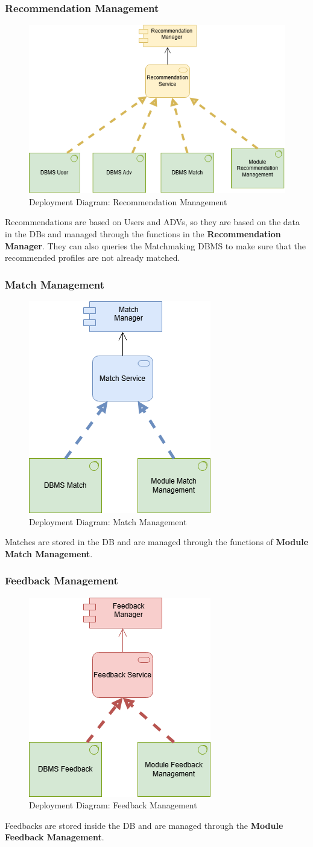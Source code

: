 \subsubsection{Recommendation Management}
\begin{figure}[H]
    \centering
    \includegraphics[width=0.45\linewidth]{images/architectural design/deployment/depl-recc.drawio.png}
    \caption{Deployment Diagram: Recommendation Management}
\end{figure}
Recommendations are based on Users and ADVs, so they are based on the data in the DBs and managed through the functions in the \textbf{Recommendation Manager}. They can also queries the Matchmaking DBMS to make sure that the recommended profiles are not already matched. 

\subsubsection{Match Management}
\begin{figure}[H]
    \centering
    \includegraphics[width=0.25\linewidth]{images/architectural design/deployment/depl-match.drawio.png}
    \caption{Deployment Diagram: Match Management}
\end{figure}
Matches are stored in the DB and are managed through the functions of \textbf{Module Match Management}.

\subsubsection{Feedback Management}
\begin{figure}[H]
    \centering
    \includegraphics[width=0.25\linewidth]{images/architectural design/deployment/depl-feed.drawio.png}
    \caption{Deployment Diagram: Feedback Management}
\end{figure}
Feedbacks are stored inside the DB and are managed through the \textbf{Module Feedback Management}.

